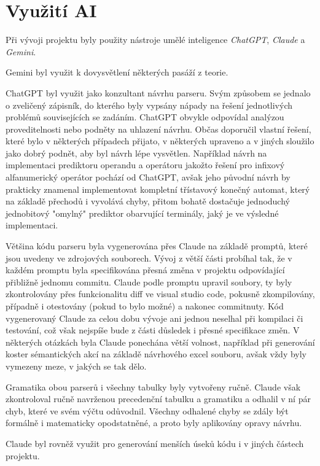 \documentclass[11pt, a4paper]{article}
\begin{document}
\section{Využití AI}

Při vývoji projektu byly použity nástroje umělé inteligence \emph{ChatGPT}, \emph{Claude} a \emph{Gemini}.

Gemini byl využit k dovysvětlení některých pasáží z teorie.

ChatGPT byl využit jako konzultant návrhu parseru. Svým způsobem se jednalo o zveličený zápisník, do kterého byly vypsány nápady na řešení jednotlivých problémů souvisejících se zadáním. ChatGPT obvykle odpovídal analýzou proveditelnosti nebo podněty na uhlazení návrhu. Občas doporučil vlastní řešení, které bylo v některých případech přijato, v některých upraveno a v jiných sloužilo jako dobrý podnět, aby byl návrh lépe vysvětlen. Například návrh na implementaci prediktoru operandu a operátoru jakožto řešení pro infixový alfanumerický operátor pochází od ChatGPT, avšak jeho původní návrh by prakticky znamenal implementovat kompletní třístavový konečný automat, který na základě přechodů i vyvolává chyby, přitom bohatě dostačuje jednoduchý jednobitový "omylný" prediktor obarvující terminály, jaký je ve výsledné implementaci.

Většina kódu parseru byla vygenerována přes Claude na základě promptů, které jsou uvedeny ve zdrojových souborech. Vývoj z větší části probíhal tak, že v každém promptu byla specifikována přesná změna v projektu odpovídající přibližně jednomu commitu. Claude podle promptu upravil soubory, ty byly zkontrolovány přes funkcionalitu diff ve visual studio code, pokusně zkompilovány, případně i otestovány (pokud to bylo možné) a nakonec commitnuty. Kód vygenerovaný Claude za celou dobu vývoje ani jednou neselhal při kompilaci či testování, což však nejspíše bude z části důsledek i přesné specifikace změn. V některých otázkách byla Claude ponechána větší volnost, například při generování koster sémantických akcí na základě návrhového excel souboru, avšak vždy byly vymezeny meze, v jakých se tak dělo.

Gramatika obou parserů i všechny tabulky byly vytvořeny ručně. Claude však zkontroloval ručně navrženou precedenční tabulku a gramatiku a odhalil v ní pár chyb, které ve svém výčtu odůvodnil. Všechny odhalené chyby se zdály být formálně i matematicky opodstatněné, a proto byly aplikovány opravy návrhu.

Claude byl rovněž využit pro generování menších úseků kódu i v jiných částech projektu.
\end{document}
